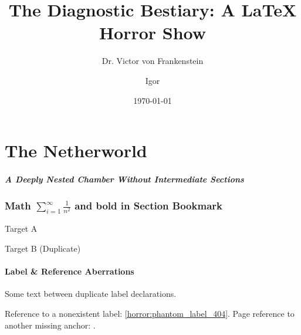 \documentclass[11pt,unused_horror_option_flag]{article}
\title{The Diagnostic Bestiary: A LaTeX Horror Show}
\author{Dr. Victor von Frankenstein \and Igor}
\date{\today}
\begin{document}
\maketitle

\part{The Netherworld}
\subsubsection{A Deeply Nested Chamber Without Intermediate Sections}

\section{Math $\sum_{i=1}^\infty \frac{1}{n^2}$ and \textbf{bold} in Section Bookmark}
\label{sec:bookmark_horror}

\hypertarget{horror_dest}{Target A}
\hypertarget{horror_dest}{Target B (Duplicate)}

\href{}{}

\subsection{Label \& Reference Aberrations}

\label{horror:dup_label}
Some text between duplicate label declarations.
\label{horror:dup_label}

Reference to a nonexistent label: \ref{horror:phantom_label_404}.
Page reference to another missing anchor: \pageref{horror:phantom_page_999}.
\end{document}
